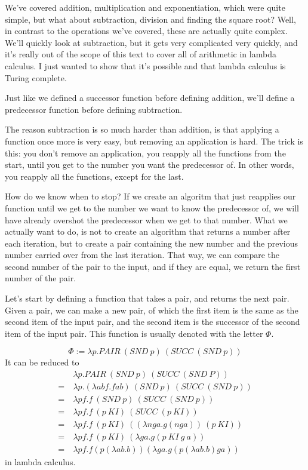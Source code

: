 \documentclass[11pt]{article}
\begin{document}
We've covered addition, multiplication and exponentiation, which were quite
simple, but what about subtraction, division and finding the square root? Well,
in contrast to the operations we've covered, these are actually quite complex.
We'll quickly look at subtraction, but it gets very complicated very quickly,
and it's really out of the scope of this text to cover all of arithmetic in
lambda calculus. I just wanted to show that it's possible and that lambda
calculus is Turing complete.


Just like we defined a successor function before defining addition, we'll
define a predecessor function before defining subtraction.


The reason subtraction is so much harder than addition, is that applying a
function once more is very easy, but removing an application is hard. The trick
is this: you don't remove an application, you reapply all the functions from
the start, until you get to the number you want the predecessor of. In other
words, you reapply all the functions, except for the last.

How do we know when to stop? If we create an algoritm that just reapplies our
function until we get to the number we want to know the predecessor of, we will
have already overshot the predecessor when we get to that number. What we
actually want to do, is not to create an algorithm that returns a number after
each iteration, but to create a pair containing the new number and the previous
number carried over from the last iteration. That way, we can compare the
second number of the pair to the input, and if they are equal, we return the
first number of the pair.

Let's start by defining a function that takes a pair, and returns the next
pair. Given a pair, we can make a new pair, of which the first item is the same
as the second item of the input pair, and the second item is the successor of
the second item of the input pair. This function is usually denoted with the
letter \(\Phi\).

\[\Phi:=\lambda p.PAIR\ (SND\ p)\ (SUCC\ (SND\ p))\]
It can be reduced to
\begin{align*}
	&\lambda p.PAIR\ (SND\ p)\ (SUCC\ (SND\ P))\\
	=\ &\lambda p.(\lambda abf.fab)\ (SND\ p)\ (SUCC\ (SND\ p))\\
	=\ &\lambda pf.f\ (SND\ p)\ (SUCC\ (SND\ p))\\
	=\ &\lambda pf.f\ (p\ KI)\ (SUCC\ (p\ KI))\\
	=\ &\lambda pf.f\ (p\ KI)\ ((\lambda nga.g(nga))\ (p\ KI))\\
	=\ &\lambda pf.f\ (p\ KI)\ (\lambda ga.g(p\ KI\ g\ a))\\
	=\ &\lambda pf.f(p(\lambda ab.b))(\lambda ga.g(p(\lambda ab.b)ga))
\end{align*}
in lambda calculus.
\end{document}
